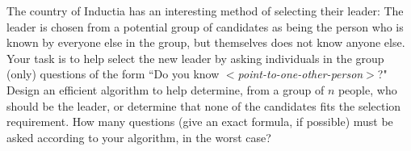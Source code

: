 \documentclass[12pt]{article}
\begin{document}
The country of Inductia has an interesting method of selecting their leader: The leader is chosen from a potential group of candidates as being the person who is known by everyone else in the group, but themselves does not know anyone else. Your task is to help select the new leader by asking individuals in the group (only) questions of the form ``Do you know \emph{$<$point-to-one-other-person$>$}?" Design an efficient algorithm to help determine, from a group of $n$ people, who should be the leader, or determine that none of the candidates fits the selection requirement. How many questions (give an exact formula, if possible) must be asked according to your algorithm, in the worst case?
\end{document}
